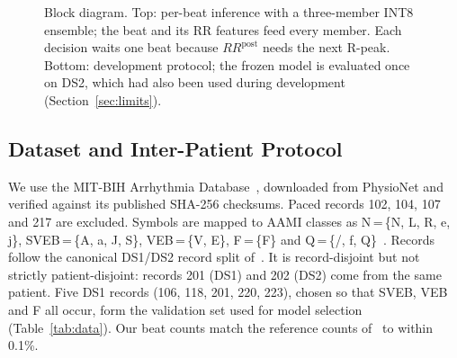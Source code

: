 \documentclass[conference]{IEEEtran}
\begin{document}
\begin{figure}[t]
\caption{Block diagram. Top: per-beat inference with a three-member INT8 ensemble; the beat and its RR features feed every member. Each decision waits one beat because $RR^{\mathrm{post}}$ needs the next R-peak. Bottom: development protocol; the frozen model is evaluated once on DS2, which had also been used during development (Section~\ref{sec:limits}).}
\label{fig:system}
\end{figure}

\subsection{Dataset and Inter-Patient Protocol}
We use the MIT-BIH Arrhythmia Database~\cite{moody2001impact,goldberger2000physiobank}, downloaded from PhysioNet and verified against its published SHA-256 checksums. Paced records 102, 104, 107 and 217 are excluded. Symbols are mapped to AAMI classes as N\,=\,\{N, L, R, e, j\}, SVEB\,=\,\{A, a, J, S\}, VEB\,=\,\{V, E\}, F\,=\,\{F\} and Q\,=\,\{/, f, Q\}~\cite{aami2012ec57}. Records follow the canonical DS1/DS2 record split of~\cite{dechazal2004automatic}. It is record-disjoint but not strictly patient-disjoint: records 201 (DS1) and 202 (DS2) come from the same patient. Five DS1 records (106, 118, 201, 220, 223), chosen so that SVEB, VEB and F all occur, form the validation set used for model selection (Table~\ref{tab:data}). Our beat counts match the reference counts of~\cite{dechazal2004automatic} to within 0.1\%.
\end{document}
